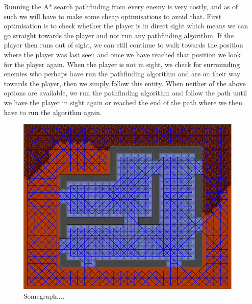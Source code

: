 Running the A* search pathfinding from every enemy is very costly, and as of such we will have to make some cheap optimisations to avoid that.
First optimisation is to check whether the player is in direct sight which means we can go straight towards the player and not run any pathfinding algorithm.
If the player then runs out of sight, we can still continue to walk towards the position where the player was last seen and once we have reached that position we look for the player again.
When the player is not in sight, we check for surrounding enemies who perhaps have run the pathfinding algorithm and are on their way towards the player, then we simply follow this entity.
When neither of the above options are available, we run the pathfinding algorithm and follow the path until we have the player in sight again or reached the end of the path where we then have to run the algorithm again.




\begin{figure}
	\includegraphics[width=\textwidth]{figures/astar/gridGraph}
	\caption{Somegraph....}
	\label{gridGraph}
\end{figure}

